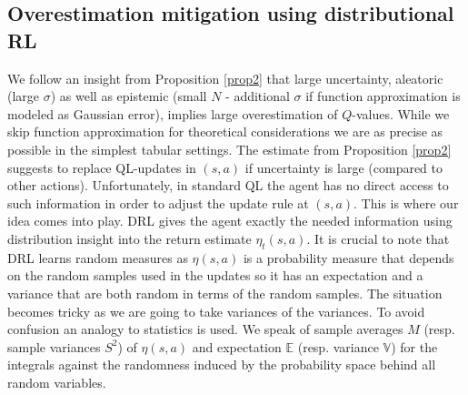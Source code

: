 \documentclass{article}
\newcommand{\E}{\mathbb{E}}
\theoremstyle{plain}
\theoremstyle{definition}
\theoremstyle{remark}
\begin{document}
 \subsection{Overestimation mitigation using distributional RL}\label{sec:overestimation}
We follow an insight from Proposition \ref{prop2} that large uncertainty, aleatoric (large $\sigma$) as well as epistemic (small $N$ - additional $\sigma$ if function approximation is modeled as Gaussian error), implies large overestimation of $Q$-values. While we skip function approximation for theoretical considerations we are as precise as possible in the simplest tabular settings. The estimate from Proposition \ref{prop2} suggests to replace QL-updates in $(s,a)$ if uncertainty is large (compared to other actions). Unfortunately, in standard QL the agent has no direct access to such information in order to adjust the update rule at $(s,a)$. This is where our idea comes into play. DRL gives the agent exactly the needed information using distribution insight into the return estimate $\eta_t(s,a)$. It is crucial to note that DRL learns random measures as $\eta(s,a)$ is a probability measure that depends on the random samples used in the updates so it has an expectation and a variance that are both random in terms of the random samples. The situation becomes tricky as we are going to take variances of the variances. To avoid confusion an analogy to statistics is used. We speak of sample averages $M$ (resp. sample variances $S^2$) of $\eta(s,a)$ and expectation $\E$ (resp. variance $\mathbb V$) for the integrals against the randomness induced by the probability space behind all random variables.
\end{document}
